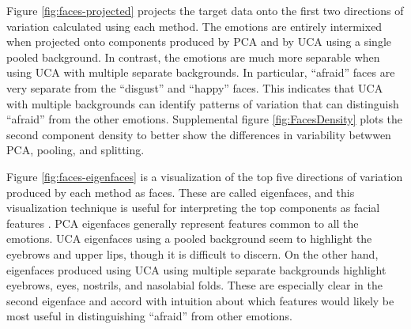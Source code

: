 \documentclass[12pt]{article}
\begin{document}
Figure \ref{fig:faces-projected} projects the target data onto the first two directions of variation calculated using each method. The emotions are entirely intermixed when projected onto components produced by PCA and by UCA using a single pooled background. In contrast, the emotions are much more separable when using UCA with multiple separate backgrounds. In particular, ``afraid'' faces are very separate from the ``disgust'' and ``happy'' faces. This indicates that UCA with multiple backgrounds can identify patterns of variation that can distinguish ``afraid'' from the other emotions. Supplemental figure \ref{fig:FacesDensity} plots the second component density to better show the differences in variability betwwen PCA, pooling, and splitting.

Figure \ref{fig:faces-eigenfaces} is a visualization of the top five directions of variation produced by each method as faces. These are called eigenfaces, and this visualization technique is useful for interpreting the top components as facial features \cite{turk1991eigenfaces}. PCA eigenfaces generally represent features common to all the emotions. UCA eigenfaces using a pooled background seem to highlight the eyebrows and upper lips, though it is difficult to discern. On the other hand, eigenfaces produced using UCA using multiple separate backgrounds highlight eyebrows, eyes, nostrils, and nasolabial folds. These are especially clear in the second eigenface and accord with intuition about which features would likely be most useful in distinguishing ``afraid'' from other emotions.





\end{document}
